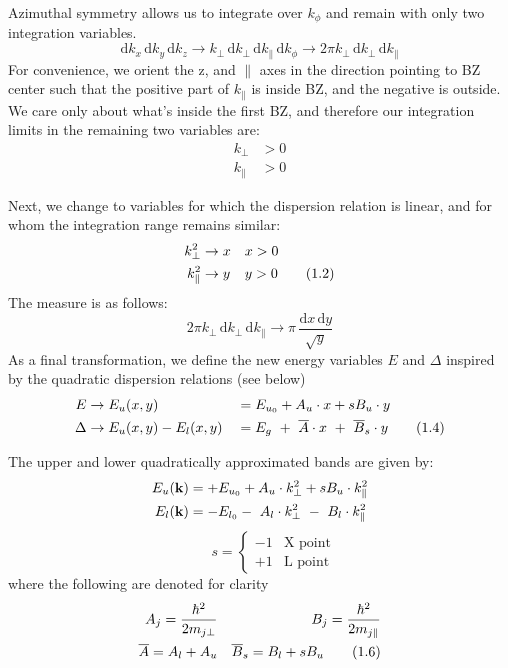 \documentclass[11pt]{article}
\newcommand{\kperp}{k_{\perp}}
\newcommand{\kpar}{k_{\parallel}}
\begin{document}
Azimuthal symmetry allows us to integrate over $k_{\phi}$ and remain with only two integration variables.
\begin{equation}
\mathrm{d}k_{x}\,\mathrm{d}k_{y}\,\mathrm{d}k_{z}\to \kperp\,\mathrm{d}\kperp\,\mathrm{d}\kpar\,\mathrm{d}k_{\phi}\to 2\pi \kperp\, \mathrm{d}\kperp\, \mathrm{d}\kpar
\tag{1.1}
\end{equation}
For convenience, we orient the z, and $\parallel$ axes in the direction pointing to BZ center such that the positive part of $\kpar$ is inside BZ, and the negative is outside. We care only about what's inside the first BZ, and therefore our integration limits in the remaining two variables are:
\begin{align*}
\kperp &>0 \\
\kpar &> 0
\end{align*}

Next, we change to variables for which the dispersion relation is linear, and for whom the integration range remains similar:
\begin{align}
\kperp^{2} &\to x && x>0 \notag\\
\kpar^{2} &\to y && y>0
\tag{1.2}
\end{align}
The measure is as follows:
\begin{equation}
2\pi \kperp\, \mathrm{d}\kperp\, \mathrm{d}\kpar \to \pi\, \frac{\mathrm{d}x\,\mathrm{d}y}{\sqrt{y}}
\tag{1.3}
\end{equation}
As a final transformation, we define the new energy variables $E$ and $\Delta$ inspired by the quadratic dispersion relations (see below)
\begin{align}
E &\to E_{u}(x,y) &&= E_{u_{0}}+A_{u}\cdot x + sB_{u}\cdot y \notag\\
\Delta &\to E_{u}(x,y) - E_{l}(x,y) &&= E_{g} \ + \ \overline{A}\cdot x \ + \ \overline{B}_{s}\cdot y
\tag{1.4}
\end{align}

\begin{notebox}
The upper and lower quadratically approximated bands are given by:
\begin{align}
E_{u}(\mathbf{k}) &= +E_{u_{0}}+A_{u}\cdot k_{\perp}^{2} + sB_{u}\cdot k_{\parallel}^{2}\notag\\
E_{l}(\mathbf{k}) &= -E_{l_{0}}- \ A_{l}\cdot k_{\perp}^{2} \ - \ B_{l}\cdot k_{\parallel}^{2}\notag
\end{align}
\begin{equation}
\qquad s = \begin{cases} -1 & \text{X point} \\ +1 & \text{L point} \end{cases}
\tag{1.5}
\end{equation}
where the following are denoted for clarity
\begin{align}
A_{j} = \frac{\hbar^{2}}{2m_{j\perp}} && B_{j} = \frac{\hbar^{2}}{2m_{j\parallel}} \notag\\
\overline{A}= A_{l}+A_{u} && \overline{B}_{s}=B_{l}+sB_{u}
\tag{1.6}
\end{align}
\end{notebox}
\end{document}
